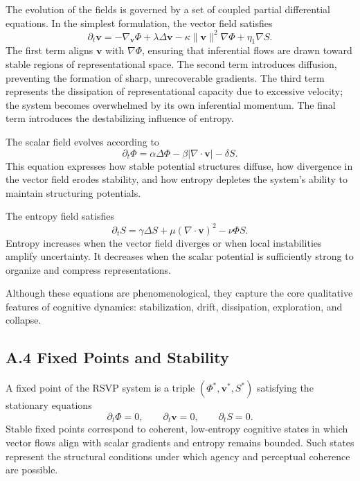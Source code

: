 \documentclass[12pt]{article}
\begin{document}
The evolution of the fields is governed by a set of coupled partial 
differential equations. In the simplest formulation, the vector field satisfies
\[
\partial_t \mathbf{v} 
= 
-\nabla_\mathbf{v} \Phi
+ \lambda \Delta \mathbf{v}
- \kappa \|\mathbf{v}\|^2 \nabla \Phi
+ \eta_1 \nabla S.
\]
The first term aligns $\mathbf{v}$ with $\nabla \Phi$, ensuring that 
inferential flows are drawn toward stable regions of representational space.  
The second term introduces diffusion, preventing the formation of sharp, 
unrecoverable gradients. The third term represents the dissipation of 
representational capacity due to excessive velocity; the system becomes 
overwhelmed by its own inferential momentum. The final term introduces the 
destabilizing influence of entropy.

The scalar field evolves according to
\[
\partial_t \Phi = 
\alpha \Delta \Phi 
- \beta |\nabla \cdot \mathbf{v}| 
- \delta S.
\]
This equation expresses how stable potential structures diffuse, how 
divergence in the vector field erodes stability, and how entropy depletes the 
system’s ability to maintain structuring potentials.

The entropy field satisfies
\[
\partial_t S = 
\gamma \Delta S
+ \mu (\nabla \cdot \mathbf{v})^2
- \nu \Phi S.
\]
Entropy increases when the vector field diverges or when local instabilities 
amplify uncertainty. It decreases when the scalar potential is sufficiently 
strong to organize and compress representations.

Although these equations are phenomenological, they capture the core 
qualitative features of cognitive dynamics: stabilization, drift, dissipation, 
exploration, and collapse.

\subsection*{A.4 Fixed Points and Stability}

A fixed point of the RSVP system is a triple $(\Phi^*, \mathbf{v}^*, S^*)$ 
satisfying the stationary equations
\[
\partial_t \Phi = 0, \qquad 
\partial_t \mathbf{v} = 0, \qquad
\partial_t S = 0.
\]
Stable fixed points correspond to coherent, low-entropy cognitive states in 
which vector flows align with scalar gradients and entropy remains bounded.  
Such states represent the structural conditions under which agency and 
perceptual coherence are possible.
\end{document}
